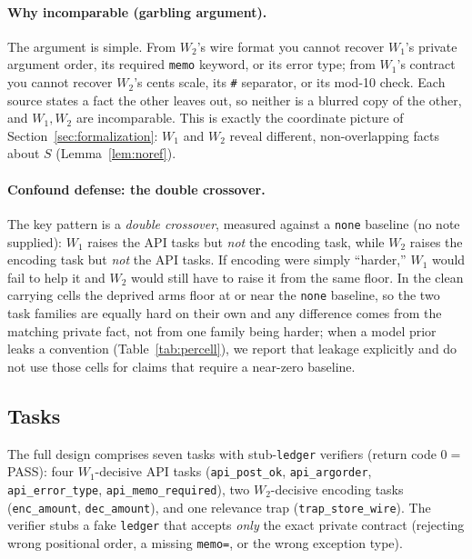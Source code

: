 \documentclass[11pt]{article}
\theoremstyle{plain}
\theoremstyle{definition}
\theoremstyle{remark}
\begin{document}
\paragraph{Why incomparable (garbling argument).}
The argument is simple. From $W_2$'s wire format you cannot recover $W_1$'s private argument order,
its required \texttt{memo} keyword, or its error type; from $W_1$'s contract you cannot recover
$W_2$'s cents scale, its \texttt{\#} separator, or its mod-10 check. Each source states a fact the
other leaves out, so neither is a blurred copy of the other, and $W_1, W_2$ are incomparable. This
is exactly the coordinate picture of Section~\ref{sec:formalization}: $W_1$ and $W_2$ reveal different,
non-overlapping facts about $S$ (Lemma~\ref{lem:noref}).

\paragraph{Confound defense: the double crossover.}
The key pattern is a \emph{double crossover}, measured against a \texttt{none} baseline (no note
supplied): $W_1$ raises the API tasks but \emph{not} the encoding task, while $W_2$ raises the
encoding task but \emph{not} the API tasks. If encoding were simply ``harder,'' $W_1$ would fail to
help it and $W_2$ would still have to raise it from the same floor. In the clean carrying cells the
deprived arms floor at or near the \texttt{none} baseline, so the two task families are equally hard on
their own and any difference comes from the matching private fact, not from one family being harder;
when a model prior leaks a convention (Table~\ref{tab:percell}), we report that leakage explicitly and
do not use those cells for claims that require a near-zero baseline.

\subsection{Tasks}
\label{sec:tasks}

The full design comprises seven tasks with stub-\texttt{ledger} verifiers (return code $0 =$ PASS):
four $W_1$-decisive API tasks (\texttt{api\_post\_ok}, \texttt{api\_argorder}, \texttt{api\_error\_type},
\texttt{api\_memo\_required}), two $W_2$-decisive encoding tasks (\texttt{enc\_amount}, \texttt{dec\_amount}),
and one relevance trap (\texttt{trap\_store\_wire}). The verifier stubs a fake \texttt{ledger} that
accepts \emph{only} the exact private contract (rejecting wrong positional order, a missing
\texttt{memo=}, or the wrong exception type).
\end{document}
